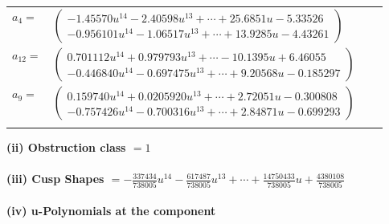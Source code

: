 \documentclass[1p]{elsarticle_modified}
\theoremstyle{definition}
\begin{document}
\begin{tabular}{m{7pt} m{180pt} m{7pt} m{180pt} }
\flushright $a_{4}=$&$\begin{pmatrix}-1.45570 u^{14}-2.40598 u^{13}+\cdots+25.6851 u-5.33526\\-0.956101 u^{14}-1.06517 u^{13}+\cdots+13.9285 u-4.43261\end{pmatrix}$ \\
\flushright $a_{12}=$&$\begin{pmatrix}0.701112 u^{14}+0.979793 u^{13}+\cdots-10.1395 u+6.46055\\-0.446840 u^{14}-0.697475 u^{13}+\cdots+9.20568 u-0.185297\end{pmatrix}$ \\
\flushright $a_{9}=$&$\begin{pmatrix}0.159740 u^{14}+0.0205920 u^{13}+\cdots+2.72051 u-0.300808\\-0.757426 u^{14}-0.700316 u^{13}+\cdots+2.84871 u-0.699293\end{pmatrix}$\\&\end{tabular}
\flushleft \textbf{(ii) Obstruction class $= 1$}\\~\\
\flushleft \textbf{(iii) Cusp Shapes $= -\frac{337434}{738005} u^{14}-\frac{617487}{738005} u^{13}+\cdots+\frac{14750433}{738005} u+\frac{4380108}{738005}$}\\~\\
\newpage\renewcommand{\arraystretch}{1}
\flushleft \textbf{(iv) u-Polynomials at the component}\newline \\
\end{document}
